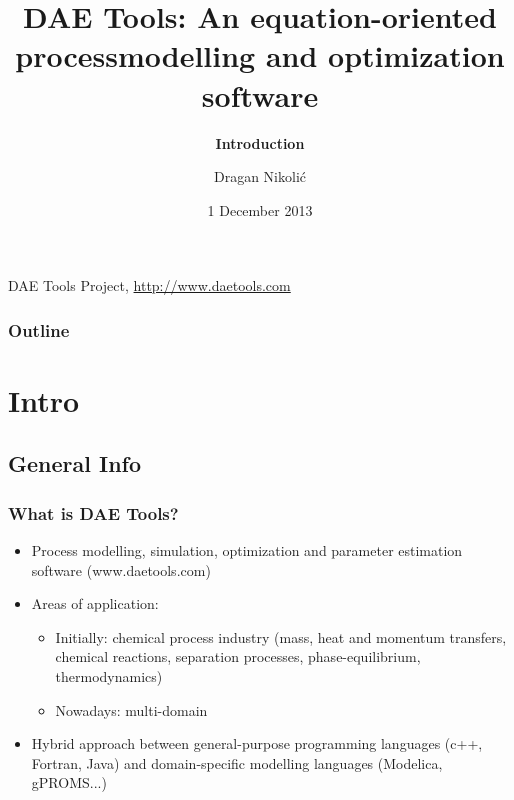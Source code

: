 \documentclass{beamer}
\begin{document}
\title[\textbf{DAE Tools} - Introduction]{\textbf{DAE Tools}: An equation-oriented process\linebreak modelling and optimization software}
\subtitle{\textbf{Introduction}}
\author{Dragan Nikolić}
\institute
{
  DAE Tools Project, \url{http://www.daetools.com}
}
\date{1 December 2013} 


\begin{frame}
\titlepage
\end{frame}

\begin{frame}
\frametitle{Outline}
\tableofcontents[currentsubsection, 
                 hideothersubsections, 
                 sectionstyle=show, 
                 subsectionstyle=hide]
\end{frame} 


\section{Intro}

\subsection{General Info}
\begin{frame}
\frametitle{What is DAE Tools?} 
\begin{block}{}
\begin{itemize}
  \item Process modelling, simulation, optimization and parameter estimation software (www.daetools.com)
  \item Areas of application:
    \begin{itemize}
      \item Initially: chemical process industry (mass, heat and momentum transfers, chemical reactions, separation processes, phase-equilibrium, thermodynamics)
      \item Nowadays: multi-domain
    \end{itemize}
  \item Hybrid approach between general-purpose programming languages (c++, Fortran, Java) and domain-specific modelling languages (Modelica, gPROMS...)
\end{itemize}
\end{block}
\end{frame}
\end{document}
